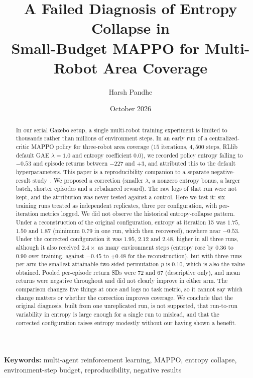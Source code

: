 \documentclass[12pt]{article}
\title{A Failed Diagnosis of Entropy Collapse in\\
Small-Budget MAPPO for Multi-Robot Area Coverage}
\author[1]{Harsh Pandhe}
\affil[1]{Independent Research \\ \texttt{harshpandhehome@gmail.com}}
\date{October 2026}
\begin{document}
\maketitle

\begin{abstract}
\noindent
In our serial Gazebo setup, a single multi-robot training experiment is
limited to thousands rather than millions of environment steps. In an early run of a centralized-critic MAPPO policy for
three-robot area coverage ($15$ iterations, $4{,}500$ steps, RLlib default
GAE $\lambda=1.0$ and entropy coefficient $0.0$), we recorded policy entropy
falling to $-0.53$ and episode returns between $-227$ and $+3$, and
attributed this to the default hyperparameters. This paper is a reproducibility companion to a separate negative-result study~\cite{pandhe2026mappo}. We proposed a correction
(smaller $\lambda$, a nonzero entropy bonus, a larger batch, shorter episodes
and a rebalanced reward). The raw logs of that run were not kept, and the
attribution was never tested against a control. Here we test it: six
training runs treated as independent replicates, three per configuration, with per-iteration
metrics logged. We did not observe the historical entropy-collapse pattern. Under a reconstruction of the original
configuration, entropy at iteration 15 was $1.75$, $1.50$ and $1.87$ (minimum
$0.79$ in one run, which then recovered), nowhere near $-0.53$. Under the
corrected configuration it was $1.95$, $2.12$ and $2.48$, higher in all
three runs, although it also received $2.4\times$ as many environment steps (entropy rose by $0.36$ to $0.90$ over training, against
$-0.45$ to $+0.48$ for the reconstruction), but with three runs per arm the
smallest attainable two-sided permutation $p$ is $0.10$, which is also the
value obtained. Pooled per-episode return SDs were $72$ and $67$ (descriptive only), and mean returns were negative throughout and did not clearly improve in either arm. The
comparison changes five things at once and logs no task metric, so it
cannot say which change matters or whether the correction improves
coverage. We conclude that the original diagnosis, built from one
unreplicated run, is not supported, that run-to-run variability in entropy
is large enough for a single run to mislead, and that the corrected
configuration raises entropy modestly without our having shown a benefit.
\end{abstract}

\noindent\textbf{Keywords:} multi-agent reinforcement learning, MAPPO,
entropy collapse, environment-step budget, reproducibility, negative results
\end{document}
